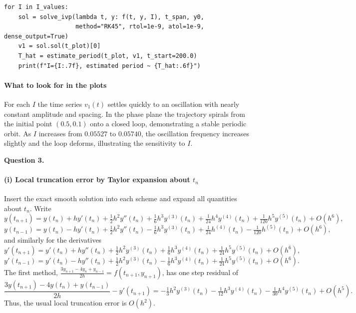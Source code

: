 \documentclass[11pt]{article}
\begin{document}
\begin{verbatim}
for I in I_values:
    sol = solve_ivp(lambda t, y: f(t, y, I), t_span, y0,
                    method="RK45", rtol=1e-9, atol=1e-9, dense_output=True)
    v1 = sol.sol(t_plot)[0]
    T_hat = estimate_period(t_plot, v1, t_start=200.0)
    print(f"I={I:.7f}, estimated period ~ {T_hat:.6f}")
\end{verbatim}

\paragraph{What to look for in the plots}
For each \(I\) the time series \(v_{1}(t)\) settles quickly to an oscillation with nearly constant amplitude and spacing. In the phase plane the trajectory spirals from the initial point \((0.5,0.1)\) onto a closed loop, demonstrating a stable periodic orbit. As \(I\) increases from \(0.05527\) to \(0.05740\), the oscillation frequency increases slightly and the loop deforms, illustrating the sensitivity to \(I\).


\newpage



{\bf Question 3.}


\paragraph{(i) Local truncation error by Taylor expansion about $t_{n}$}
Insert the exact smooth solution into each scheme and expand all quantities about $t_{n}$. Write
\[
y(t_{n+1})=y(t_{n})+h y'(t_{n})+\tfrac12 h^{2}y''(t_{n})+\tfrac16 h^{3}y^{(3)}(t_{n})+\tfrac1{24}h^{4}y^{(4)}(t_{n})+\tfrac1{120}h^{5}y^{(5)}(t_{n})+O(h^{6}),
\]
\[
y(t_{n-1})=y(t_{n})-h y'(t_{n})+\tfrac12 h^{2}y''(t_{n})-\tfrac16 h^{3}y^{(3)}(t_{n})+\tfrac1{24}h^{(4)}(t_{n})-\tfrac1{120}h^{(5)}(t_{n})+O(h^{6}),
\]
and similarly for the derivatives
\[
y'(t_{n+1})=y'(t_{n})+h y''(t_{n})+\tfrac12 h^{2}y^{(3)}(t_{n})+\tfrac16 h^{3}y^{(4)}(t_{n})+\tfrac1{24}h^{5}y^{(5)}(t_{n})+O(h^{6}),
\]
\[
y'(t_{n-1})=y'(t_{n})-h y''(t_{n})+\tfrac12 h^{2}y^{(3)}(t_{n})-\tfrac16 h^{3}y^{(4)}(t_{n})+\tfrac1{24}h^{5}y^{(5)}(t_{n})+O(h^{6}).
\]
The first method, \(\displaystyle \frac{3y_{n+1}-4y_{n}+y_{n-1}}{2h}=f(t_{n+1},y_{n+1})\),
has one step residual of
\[
\frac{3y(t_{n+1})-4y(t_{n})+y(t_{n-1})}{2h}-y'(t_{n+1})
= -\tfrac13 h^{2}y^{(3)}(t_{n})-\tfrac1{12} h^{3}y^{(4)}(t_{n})-\tfrac1{30} h^{4}y^{(5)}(t_{n})+O(h^{5}).
\]
Thus, the usual local truncation error is \(O(h^{2})\).
\end{document}
